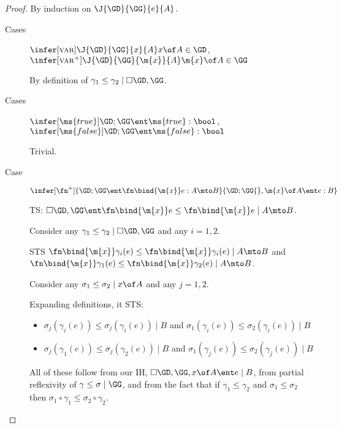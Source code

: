 \documentclass{article}
\newcommand{\lr}[2]{#2\mathrel{|}#1}
\newcommand{\lrcx}[3]{#1 \ent \lr{#2}{#3}}
\begin{document}
\begin{proof}
  By induction on $\J{\GD}{\GG}{e}{A}$.
  \begin{description}
  \item[Cases] $\infer[\rt{var}]{\J{\GD}{\GG}{x}{A}}{x\of A \in \GD}$,
    $\infer[\rt{var}^+]{\J{\GD}{\GG}{\m{x}}{A}}{\m{x} \of A \in \GG}$

    By definition of $\lr{\cxdisc{\GD},\GG}{\gamma_1 \le \gamma_2}$.

    \vspace{1em}
  \item[Cases] $\infer[\ms{true}]{\GD;\GG\ent \ms{true} : \bool}{}$,
    $\infer[\ms{false}]{\GD;\GG\ent \ms{false} : \bool}{}$

    Trivial.

    \vspace{1em}
  \item[Case] $\infer[\fn^+]{\GD;\GG \ent \fn\bind{\m{x}} e : A \mto B}{
    \GD; \GG{},\m{x}\of A \ent e : B}$

    TS: $\lrcx{\cxdisc{\GD},\GG}{A \mto B}{
      \fn\bind{\m{x}} e \le \fn\bind{\m{x}}e}$.

    Consider any $\lr{\cxdisc{\GD},\GG}{\gamma_1 \le \gamma_2}$ and any $i =
    1,2$.

    STS $\lr{A \mto B}{\fn\bind{\m{x}} \gamma_i(e) \le \fn\bind{\m{x}}
      \gamma_i(e)}$ and $\lr{A \mto B}{\fn\bind{\m{x}} \gamma_1(e) \le
      \fn\bind{\m{x}} \gamma_2(e)}$.

    Consider any $\lr{x \of A}{\sigma_1 \le \sigma_2}$ and any $j = 1,2$.

    Expanding definitions, it STS:
    \begin{itemize}
    \item $\lr{B}{\sigma_j(\gamma_i(e)) \le \sigma_j(\gamma_i(e))}$
      and $\lr{B}{\sigma_1(\gamma_i(e)) \le \sigma_2(\gamma_i(e))}$
    \item $\lr{B}{\sigma_j(\gamma_1(e)) \le \sigma_j(\gamma_2(e))}$
      and $\lr{B}{\sigma_1(\gamma_j(e)) \le \sigma_2(\gamma_j(e))}$
    \end{itemize}

    All of these follow from our IH, $\lrcx{\cxdisc{\GD},\GG,x\of A}{B}{e}$,
    from partial reflexivity of $\lr{\GG}{\gamma \le \sigma}$, and from the fact
    that if $\gamma_1 \le \gamma_2$ and $\sigma_1 \le \sigma_2$ then $\sigma_1
    \circ \gamma_1 \le \sigma_2\circ\gamma_2$.



\end{description}
\end{proof}
\end{document}
